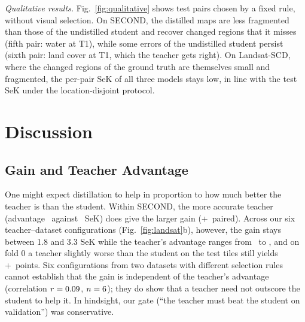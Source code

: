 \documentclass[journal]{IEEEtran}
\begin{document}


\emph{Qualitative results.} Fig.~\ref{fig:qualitative} shows test pairs chosen by a fixed rule,
without visual selection. On SECOND, the distilled maps are less fragmented than those of the
undistilled student and recover changed regions that it misses (fifth pair: water at T1), while
some errors of the undistilled student persist (sixth pair: land cover at T1, which the teacher
gets right). On Landsat-SCD, where the changed regions of the ground truth are themselves small and
fragmented, the per-pair SeK of all three models stays low, in line with the test SeK under the
location-disjoint protocol.


\section{Discussion}
\label{sec:discussion}

\subsection{Gain and Teacher Advantage}
One might expect distillation to help in proportion to how much better the teacher is than the
student. Within SECOND, the more accurate teacher (advantage \TeacherAdvVitg\ against
\TeacherAdvVmb\ SeK) does give the larger gain (+\TeacherDiff\ paired). Across our six
teacher--dataset configurations (Fig.~\ref{fig:landsat}b), however, the gain stays between 1.8 and
3.3 SeK while the teacher's advantage ranges from \FZeroTMinusB\ to \TeacherAdvVitg, and on fold 0 a teacher
slightly worse than the student on the test tiles still yields +\FZeroGain\ points. Six
configurations from two datasets with different selection rules cannot establish that the gain is
independent of the teacher's advantage (correlation $r=0.09$, $n=6$); they do show that a
teacher need not outscore the student to help it. In hindsight, our gate (``the teacher must beat
the student on validation'') was conservative.
\end{document}

